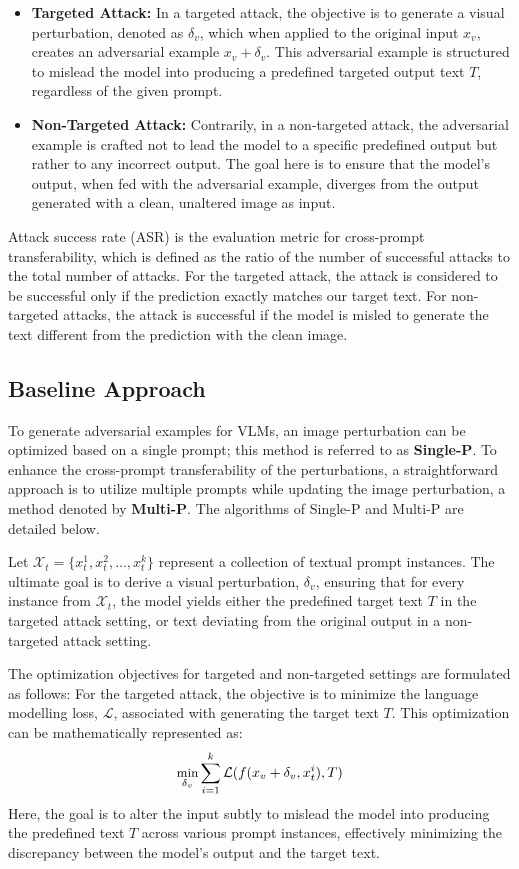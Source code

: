 \begin{itemize}
    \item \textbf{Targeted Attack:} In a targeted attack, the objective is to generate a visual perturbation, denoted as $\delta_v$, which when applied to the original input \( x_v \), creates an adversarial example $x_v+\delta_v$. This adversarial example is structured to mislead the model into producing a predefined targeted output text $T$, regardless of the given prompt. 
    \item \textbf{Non-Targeted Attack:} 
    Contrarily, in a non-targeted attack, the adversarial example is crafted not to lead the model to a specific predefined output but rather to any incorrect output. The goal here is to ensure that the model's output, when fed with the adversarial example, diverges from the output generated with a clean, unaltered image as input.
\end{itemize}
Attack success rate (ASR) is the evaluation metric for cross-prompt transferability, which is defined as the ratio of the number of successful attacks to the total number of attacks. For the targeted attack, the attack is considered to be successful only if the prediction exactly matches our target text. For non-targeted attacks, the attack is successful if the model is misled to generate the text different from the prediction with the clean image.

\subsection{Baseline Approach} 

To generate adversarial examples for VLMs, an image perturbation can be optimized based on a single prompt; this method is referred to as \textbf{Single-P}. To enhance the cross-prompt transferability of the perturbations, a straightforward approach is to utilize multiple prompts while updating the image perturbation, a method denoted by \textbf{Multi-P}.
The algorithms of Single-P and Multi-P are detailed below.

Let \(\mathcal{X}_t = \{x_t^1, x_t^2, \dots, x_t^k\}\) represent a collection of textual prompt instances. The ultimate goal is to derive a visual perturbation, \(\delta_v\), ensuring that for every instance from \(\mathcal{X}_t\), the model yields either the predefined target text \(T\) in the targeted attack setting, or text deviating from the original output in a non-targeted attack setting.

The optimization objectives for targeted and non-targeted settings are formulated as follows:
For the targeted attack, the objective is to minimize the language modelling loss, \( \mathcal{L} \), associated with generating the target text \( T \). This optimization can be mathematically represented as:
\begin{equation}
\small
        \underset{\delta_v}{\text{min}} \sum_{i=1}^{k} \mathcal{L}(f(x_v + \delta_v, x_t^i), T)
\end{equation}
Here, the goal is to alter the input subtly to mislead the model into producing the predefined text \( T \) across various prompt instances, effectively minimizing the discrepancy between the model's output and the target text.

